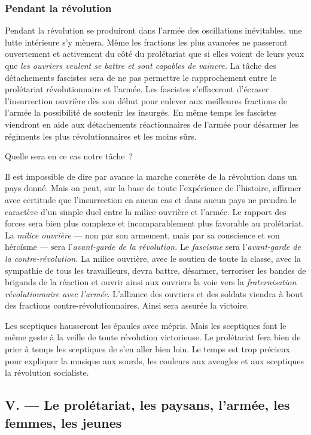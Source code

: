 \documentclass[french,twoside]{book} %
\begin{document}
\subsubsection[{Pendant la révolution}]{Pendant la révolution}
\noindent Pendant la révolution se produiront dans l’armée des oscillations inévitables, une lutte intérieure s’y mènera. Même les fractions les plus avancées ne passeront ouvertement et activement du côté du prolétariat que si elles voient de leurs yeux que \emph{les ouvriers veulent se battre et sont capables de vaincre.} La tâche des détachements fascistes sera de ne pas permettre le rapprochement entre le prolétariat révolutionnaire et l’armée. Les fascistes s’effaceront d’écraser l’insurrection ouvrière dès son début pour enlever aux meilleures fractions de l’armée la possibilité de soutenir les insurgés. En même temps les fascistes viendront en aide aux détachements réactionnaires de l’armée pour désarmer les régiments les plus révolutionnaires et les moins sûrs.\par
 Quelle sera en ce cas notre tâche ?\par
Il est impossible de dire par avance la marche concrète de la révolution dans un pays donné. Mais on peut, sur la base de toute l’expérience de l’histoire, affirmer avec certitude que l’insurrection en aucun cas et dans aucun pays ne prendra le caractère d’un simple duel entre la milice ouvrière et l’armée. Le rapport des forces sera bien plus complexe et incomparablement plus favorable au prolétariat. La \emph{milice ouvrière} — non par son armement, mais par sa conscience et son héroïsme — sera l’\emph{avant-garde de la révolution.} Le \emph{fascisme} sera l’\emph{avant-garde de la contre-révolution.} La milice ouvrière, avec le soutien de toute la classe, avec la sympathie de tous les travailleurs, devra battre, désarmer, terroriser les bandes de brigands de la réaction et ouvrir ainsi aux ouvriers la voie vers la \emph{fraternisation révolutionnaire avec l’armée}. L’alliance des ouvriers et des soldats viendra à bout des fractions contre-révolutionnaires. Ainsi sera assurée la victoire.\par
Les sceptiques hausseront les épaules avec mépris. Mais les sceptiques font le même geste à la veille de toute révolution victorieuse. Le prolétariat fera bien de prier à temps les sceptiques de s’en aller bien loin. Le temps est trop précieux pour expliquer la musique aux sourds, les couleurs aux aveugles et aux sceptiques la révolution socialiste.
\subsection[{V. — Le prolétariat, les paysans, l’armée, les femmes, les jeunes}]{V. — Le prolétariat, les paysans, l’armée, les femmes, les jeunes}
\end{document}
